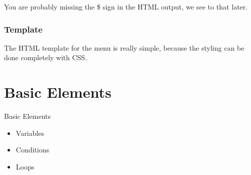 

You are probably missing the \$ sign in the HTML output, we see
to that later.

\subsubsection{Template}
The HTML template for the menu is really simple, because the
styling can be done completely with CSS.






\section{Basic Elements}
\begin{frame}{Basic Elements}
\begin{itemize}
\item Variables
\item Conditions
\item Loops
\end{itemize}
\end{frame}

